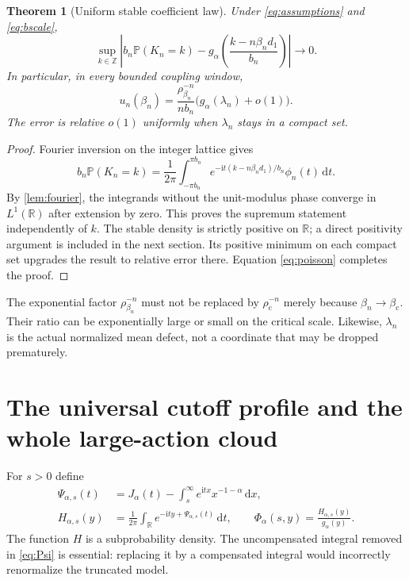 \documentclass[11pt,a4paper]{article}
\numberwithin{equation}{section}
\newtheorem{theorem}{Theorem}[section]
\theoremstyle{definition}\newtheorem{definition}[theorem]{Definition}
\theoremstyle{remark}\newtheorem{remark}[theorem]{Remark}
\theoremstyle{definition}
\newcommand{\R}{\mathbb R}\newcommand{\C}{\mathbb C}
\newcommand{\Prob}{\mathbb P}\newcommand{\ii}{\mathrm i}
\newcommand{\bc}{\beta_{\mathrm c}}\newcommand{\rhoc}{\rho_{\mathrm c}}
\newcommand{\dd}{\,\mathrm d}
\begin{document}
\begin{theorem}[Uniform stable coefficient law]\label{thm:local}
Under \eqref{eq:assumptions} and \eqref{eq:bscale},
\begin{equation}\label{eq:llt}
 \sup_{k\in\mathbb Z}
 \left|b_n\Prob(K_n=k)
 -g_\alpha\!\left(\frac{k-n\beta_n d_1}{b_n}\right)\right|\to0.
\end{equation}
In particular, in every bounded coupling window,
\begin{equation}\label{eq:coeffleading}
 \boxed{\quad u_n(\beta_n)=\frac{\rho_{\beta_n}^{-n}}{n b_n}
 \bigl(g_\alpha(\lambda_n)+o(1)\bigr).\quad}
\end{equation}
The error is relative $o(1)$ uniformly when $\lambda_n$ stays in a compact
set.
\end{theorem}
\begin{proof}
Fourier inversion on the integer lattice gives
\[
 b_n\Prob(K_n=k)=\frac1{2\pi}\int_{-\pi b_n}^{\pi b_n}
 e^{-\ii t(k-n\beta_n d_1)/b_n}\phi_n(t)\dd t.
\]
By \cref{lem:fourier}, the integrands without the unit-modulus phase
converge in $L^1(\R)$ after extension by zero. This proves the supremum
statement independently of $k$. The stable density is strictly positive
on $\R$; a direct positivity argument is included in the next section.
Its positive minimum on each compact set upgrades the result to relative
error there. Equation \eqref{eq:poisson} completes the proof.
\end{proof}

The exponential factor $\rho_{\beta_n}^{-n}$ must not be replaced by
$\rhoc^{-n}$ merely because $\beta_n\to\bc$. Their ratio can be exponentially
large or small on the critical scale. Likewise, $\lambda_n$ is the actual
normalized mean defect, not a coordinate that may be dropped prematurely.

\section{The universal cutoff profile and the whole large-action cloud}
\label{sec:cutoff}

For $s>0$ define
\begin{align}
 \Psi_{\alpha,s}(t)
 &=J_\alpha(t)-\int_s^\infty e^{\ii tx}x^{-1-\alpha}\dd x,
 \label{eq:Psi}\\
 H_{\alpha,s}(y)&=\frac1{2\pi}\int_\R
                    e^{-\ii ty+\Psi_{\alpha,s}(t)}\dd t,
 \qquad
 \Phi_\alpha(s,y)=\frac{H_{\alpha,s}(y)}{g_\alpha(y)}.
 \label{eq:Phi}
\end{align}
The function $H$ is a subprobability density. The uncompensated integral
removed in \eqref{eq:Psi} is essential: replacing it by a compensated
integral would incorrectly renormalize the truncated model.
\end{document}
